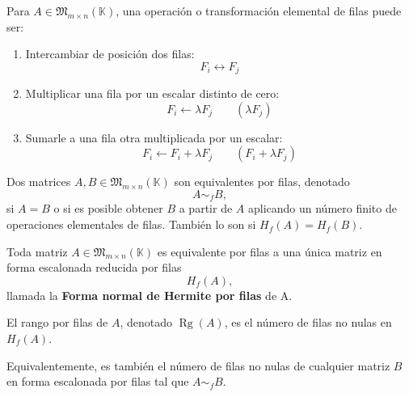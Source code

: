 \documentclass[a4paper,12pt]{article}
\begin{document}
\begin{procedimiento}[title=Operación o Transformación de filas]
Para $A \in \mathfrak{M}_{m \times n}(\mathbb{K})$, una operación o transformación elemental de filas puede ser:
\begin{enumerate}
\item Intercambiar de posición dos filas:
\[
F_i \longleftrightarrow F_j
\]
\item Multiplicar una fila por un escalar distinto de cero:
\[
F_i \longleftarrow \lambda F_j \qquad (\lambda F_j)
\]
\item Sumarle a una fila otra multiplicada por un escalar:
\[
F_i \longleftarrow F_i + \lambda F_j \qquad (F_i + \lambda F_j)
\]
\end{enumerate}
\end{procedimiento}

\begin{procedimiento}[title=Matrices equivalentes por filas]
Dos matrices $A,B \in \mathfrak{M}_{m \times n}(\mathbb{K})$ son equivalentes por filas, denotado
\[
A \sim_f B,
\]
si $A=B$ o si es posible obtener $B$ a partir de $A$ aplicando un número finito de operaciones elementales de filas. También lo son si $H_f(A) = H_f(B)$. 
\end{procedimiento}

\begin{procedimiento}[title=Forma normal de Hermite por filas]
Toda matriz $A \in \mathfrak{M}_{m \times n}(\mathbb{K})$ es equivalente por filas a una única matriz en forma escalonada reducida por filas
\[
H_f(A),
\]
llamada la \textbf{Forma normal de Hermite por filas} de A.
\end{procedimiento}

\begin{procedimiento}[title=Rango por filas]
El rango por filas de $A$, denotado $\operatorname{Rg}(A)$, es el número de filas no nulas en $H_f(A)$.

Equivalentemente, es también el número de filas no nulas de cualquier matriz $B$ en forma escalonada por filas tal que $A \sim_f B$.
\end{procedimiento}
\end{document}
